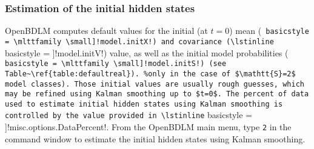 \subsubsection{Estimation of the initial hidden states}

OpenBDLM computes default values for the initial (at $t=0$) mean (\lstinline[ basicstyle = \mlttfamily \small]!model.initX!) and covariance (\lstinline[ basicstyle = \mlttfamily \small]!model.initV!) value, as well as the initial model probabilities (\lstinline[ basicstyle = \mlttfamily \small]!model.initS!) (see Table~\ref{table:defaultreal}). %
Those initial values are usually rough guesses, which may be refined using Kalman smoothing up to $t=0$.
The percent of data used to estimate initial hidden states using Kalman smoothing is controlled by the value provided in \lstinline[ basicstyle = \mlttfamily \small]!misc.options.DataPercent!.
From the OpenBDLM main menu, type \colorbox{light-gray}{\lstinline[basicstyle = \mlttfamily \small, backgroundcolor = \color{light-gray}]!2!}  in the \MATLAB{} command window to estimate the initial hidden states using Kalman smoothing.



